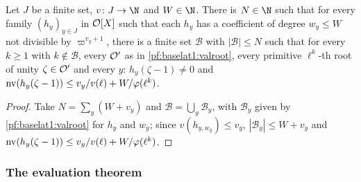 \begin{corollary}\label{pf:baselat1:levels}
Let $J$ be a finite set, $v\colon J\to\N$ and $W\in\N$. There is $N\in\N$ such that for every family $(h_y)_{y\in J}$ in
$\mathcal O[X]$ such that each $h_y$ has a coefficient of degree $w_y\le W$ not divisible by $\varpi^{v_y+1}$, there is a
finite set $\mathcal B$ with $|\mathcal B|\le N$ such that for every $k\ge1$ with $k\notin\mathcal B$, every $\mathcal O'$
as in \cref{pf:baselat1:valroot}, every primitive $\ell^k$-th root of unity $\zeta\in\mathcal O'$ and every $y$:
$h_y(\zeta-1)\neq0$ and $\operatorname{nv}(h_y(\zeta-1))\le v_y/v(\ell)+W/\varphi(\ell^k)$.
\end{corollary}

\begin{proof}
Take $N=\sum_y(W+v_y)$ and $\mathcal B=\bigcup_y\mathcal B_y$, with $\mathcal B_y$ given by \cref{pf:baselat1:valroot} for
$h_y$ and $w_y$; since $v(h_{y,w_y})\le v_y$, $|\mathcal B_y|\le W+v_y$ and
$\operatorname{nv}(h_y(\zeta-1))\le v_y/v(\ell)+W/\varphi(\ell^k)$.
\end{proof}

\subsubsection{The evaluation theorem}

